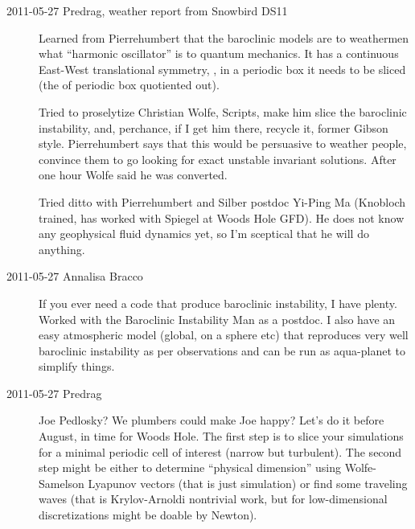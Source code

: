 \begin{description}

\item[2011-05-27 Predrag, weather report from Snowbird DS11]
	\toCB
Learned from Pierrehumbert that the baroclinic models are to weathermen
what ``harmonic oscillator'' is to quantum mechanics. It has a continuous
East-West translational symmetry, \ie, in a periodic box it needs to be
sliced (the  of periodic box quotiented out).

Tried to proselytize Christian Wolfe, Scripts,  make him slice
the baroclinic instability, and, perchance, if I get him there, recycle
it, former Gibson style. Pierrehumbert says that this would be persuasive
to weather people, convince them to go looking for exact unstable
invariant solutions. After one hour Wolfe said he was converted.

Tried ditto with Pierrehumbert and Silber postdoc Yi-Ping Ma (Knobloch
trained, has worked with Spiegel at Woods Hole GFD). He does not know any
geophysical fluid dynamics yet, so I'm sceptical that he will do anything.

\item[2011-05-27 Annalisa Bracco]
If you ever need a code that produce baroclinic instability, I have
plenty. Worked with the Baroclinic Instability Man as a postdoc. I also
have an easy atmospheric model (global, on a sphere etc) that reproduces
very well baroclinic instability as per observations and can be run as
aqua-planet to simplify things.

\item[2011-05-27 Predrag]
Joe Pedlosky? We plumbers could make Joe happy? Let's do it before
August, in time for Woods Hole. The first step is to slice your
simulations for a minimal periodic cell of interest (narrow but
turbulent). The second step might be either to determine ``physical
dimension'' using Wolfe-Samelson Lyapunov vectors (that is
just simulation) or find some traveling waves (that is Krylov-Arnoldi
nontrivial work, but for low-dimensional discretizations might be doable
by Newton).


\end{description}
